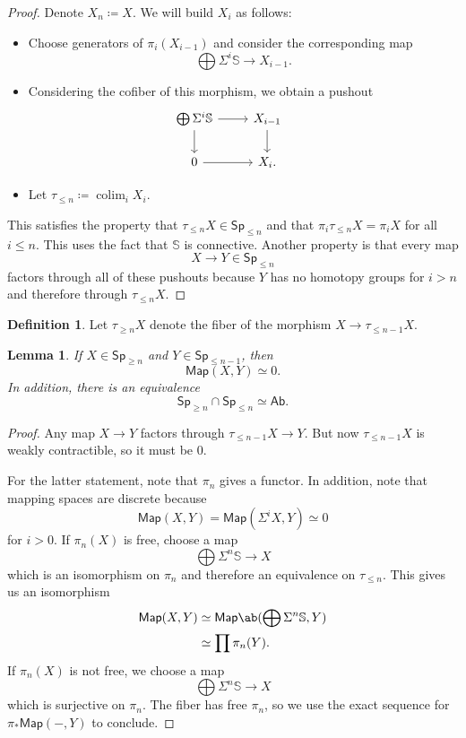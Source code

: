 \documentclass[10pt, oneside]{memoir}
\newtheorem{lem}[thm]{Lemma}
\theoremstyle{definition}
\newtheorem{defn}[thm]{Definition}
\theoremstyle{remark}
\theoremstyle{plain}
\theoremstyle{definition}
\theoremstyle{remark}
\newcommand{\bS}{\mathbb{S}}
\newcommand{\ms}[1]{\mathsf{#1}}
\newcommand{\1}{\mathbf{1}}
\newcommand{\2}{\mathbf{2}}
\newcommand{\3}{\mathbf{3}}
\DeclareMathOperator*{\colim}{colim}
\begin{document}
\begin{proof}
    Denote \(X_n \coloneqq X \). We will build \(X_i \) as follows:
    \begin{itemize}
        \item Choose generators of \(\pi_i(X_{i-1}) \) and consider the corresponding map
        \[ \bigoplus \Sigma^i \bS \to X_{i-1}. \]
        \item Considering the cofiber of this morphism, we obtain a pushout
        \begin{equation*}
        \begin{tikzcd}
            \bigoplus \Sigma^i \bS \ar{r} \ar{d} & X_{i-1} \ar{d} & \\
            0 \ar{r} & X_i.
        \end{tikzcd}
        \end{equation*}
        \item Let \(\tau_{\leq n} \coloneqq \colim_i X_i \).
    \end{itemize}
    This satisfies the property that \(\tau_{\leq n} X \in \ms{Sp}_{\leq n} \) and that \(\pi_i \tau_{\leq n} X = \pi_i X \) for all \(i \leq n \). This uses the fact that \(\bS \) is connective. Another property is that every map
    \[ X \to Y \in \ms{Sp}_{\leq n} \]
    factors through all of these pushouts because \(Y \) has no homotopy groups for \(i > n \) and therefore through \(\tau_{\leq n} X \).
\end{proof}

\begin{defn}
    Let \(\tau_{\geq n} X \) denote the fiber of the morphism \(X \to \tau_{\leq n-1} X \).
\end{defn}

\begin{lem}
    If \(X \in \ms{Sp}_{\geq n} \) and \(Y \in \ms{Sp}_{\leq n-1} \), then
    \[ \ms{Map}(X, Y) \simeq 0. \]
    In addition, there is an equivalence
    \[ \ms{Sp}_{\geq n} \cap \ms{Sp}_{\leq n} \simeq \ms{Ab}. \]
\end{lem}

\begin{proof}
    Any map \(X \to Y \) factors through \(\tau_{\leq n-1} X \to Y \). But now \(\tau_{\leq n-1} X \) is weakly contractible, so it must be \(0 \).

    For the latter statement, note that \(\pi_n \) gives a functor. In addition, note that mapping spaces are discrete because
    \[ \ms{Map}(X, Y) = \ms{Map}(\Sigma^i X, Y) \simeq 0 \]
    for \(i > 0 \). If \(\pi_n(X) \) is free, choose a map
    \[ \bigoplus \Sigma^n \bS \to X \]
    which is an isomorphism on \(\pi_n \) and therefore an equivalence on \(\tau_{\leq n} \). This gives us an isomorphism
    \begin{align*}
        \ms{Map}(X, Y) &\simeq \ms{Map} \ab(\bigoplus \Sigma^n \bS, Y) \\
        &\simeq \prod \pi_n(Y).
    \end{align*}
    If \(\pi_n(X) \) is not free, we choose a map
    \[ \bigoplus \Sigma^n \bS \to X \]
    which is surjective on \(\pi_n \). The fiber has free \(\pi_n \), so we use the exact sequence for \(\pi_* \ms{Map}(-, Y) \) to conclude.
\end{proof}
\end{document}
